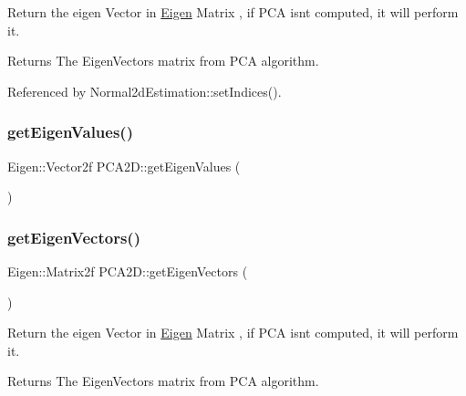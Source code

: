 Return the eigen Vector in \hyperlink{namespaceEigen}{Eigen} Matrix , if P\+CA isn\textquotesingle{}t computed, it will perform it. 

\begin{DoxyReturn}{Returns}
The Eigen\+Vectors matrix from P\+CA algorithm. 
\end{DoxyReturn}


Referenced by Normal2d\+Estimation\+::set\+Indices().

\mbox{\label{classPCA2D_ace26902adea167c5aef9a3219ceafbd3}} 
\subsubsection{\texorpdfstring{get\+Eigen\+Values()}{getEigenValues()}\hspace{0.1cm}{\footnotesize\ttfamily [2/2]}}
{\footnotesize\ttfamily Eigen\+::\+Vector2f P\+C\+A2\+D\+::get\+Eigen\+Values (\begin{DoxyParamCaption}{ }\end{DoxyParamCaption})\hspace{0.3cm}{\ttfamily [inline]}}

\mbox{\label{classPCA2D_a2243f1d03a734f7cf4f9f959f494a2e0}} 
\subsubsection{\texorpdfstring{get\+Eigen\+Vectors()}{getEigenVectors()}\hspace{0.1cm}{\footnotesize\ttfamily [1/2]}}
{\footnotesize\ttfamily Eigen\+::\+Matrix2f P\+C\+A2\+D\+::get\+Eigen\+Vectors (\begin{DoxyParamCaption}{ }\end{DoxyParamCaption})\hspace{0.3cm}{\ttfamily [inline]}}



Return the eigen Vector in \hyperlink{namespaceEigen}{Eigen} Matrix , if P\+CA isn\textquotesingle{}t computed, it will perform it. 

\begin{DoxyReturn}{Returns}
The Eigen\+Vectors matrix from P\+CA algorithm. 
\end{DoxyReturn}


